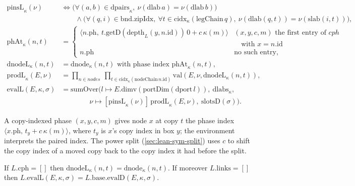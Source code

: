 \begin{definition}\label{def:lean-sym-evalL}
\begin{align*}
\mathrm{pinsL}_\kappa(\nu)&\iff\bigl(\forall (a,b)\in\mathrm{dpairs}_\kappa,\ \nu(\mathrm{dlab}\,a)=\nu(\mathrm{dlab}\,b)\bigr)\\
&\qquad\land\bigl(\forall (q,i)\in\mathrm{bnd.zipIdx},\ \forall t\in\mathrm{cidx}_\kappa(\mathrm{legChain}\,q),\ \nu(\mathrm{dlab}(q,t))=\nu(\mathrm{slab}(i,t))\bigr),\\
\mathrm{phAt}_\kappa(n,t)&=\begin{cases}\bigl\langle n.\mathrm{ph},\ t.\mathrm{getD}(\mathrm{depth}_L(y,n.\mathrm{id}))\,0+c\,\kappa(m)\bigr\rangle&(x,y,c,m)\text{ the first entry of }\mathit{cph}\\&\quad\text{with }x=n.\mathrm{id}\\ n.\mathrm{ph}&\text{no such entry,}\end{cases}\\
\mathrm{dnodeL}_\kappa(n,t)&=\mathrm{dnode}_\kappa(n,t)\text{ with phase index }\mathrm{phAt}_\kappa(n,t),\\
\mathrm{prodL}_\kappa(E,\nu)&=\prod_{n\in\mathit{nodes}}\ \prod_{t\in\mathrm{cidx}_\kappa(\mathrm{nodeChain}\,n.\mathrm{id})}\mathrm{val}(E,\nu,\mathrm{dnodeL}_\kappa(n,t)),\\
\mathrm{evalL}(E,\kappa,\sigma)&=\mathrm{sumOver}\bigl(l\mapsto E.\mathrm{dimv}(\mathrm{portDim}(\mathrm{dport}\,l)),\ \mathrm{dlabs}_\kappa,\\
&\qquad\qquad \nu\mapsto[\mathrm{pinsL}_\kappa(\nu)]\,\mathrm{prodL}_\kappa(E,\nu),\ \mathrm{slotsD}(\sigma)\bigr).
\end{align*}
\end{definition}

A copy-indexed phase $(x,y,c,m)$ gives node $x$ at copy $t$ the phase index $\langle x.\mathrm{ph},\,t_y+c\,\kappa(m)\rangle$, where $t_y$ is $x$'s copy index in box $y$; the environment interprets the paired index. The power split (\cref{sec:lean-sym-split}) uses $c$ to shift the copy index of a moved copy back to the copy index it had before the split.

\begin{theorem}\label{thm:lean-sym-plain}
If $L.\mathrm{cph}=[]$ then $\mathrm{dnodeL}_\kappa(n,t)=\mathrm{dnode}_\kappa(n,t)$. If moreover $L.\mathrm{links}=[]$ then $L.\mathrm{evalL}(E,\kappa,\sigma)=L.\mathrm{base}.\mathrm{evalD}(E,\kappa,\sigma)$.
\end{theorem}

